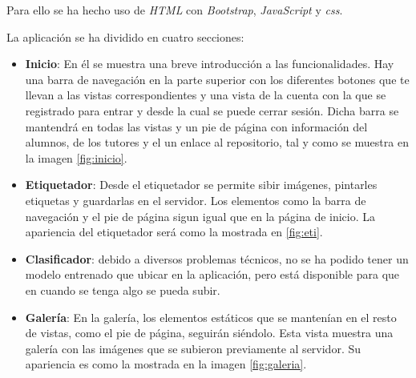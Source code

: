  Para ello se ha hecho uso de \textit{HTML} con \textit{Bootstrap}, \textit{JavaScript} y \textit{css}.
 
 La aplicación se ha dividido en cuatro secciones:
 
 \begin{itemize}
 	\item \textbf{Inicio}: En él se muestra una breve introducción a las funcionalidades. Hay una barra de navegación en la parte superior con los diferentes botones que te llevan a las vistas correspondientes y una vista de la cuenta con la que se registrado para entrar y desde la cual se puede cerrar sesión.
 	 Dicha barra se mantendrá en todas las vistas y un pie de página con información del alumnos, de los tutores y el un enlace al repositorio, tal y como se muestra en la imagen \ref{fig:inicio}.
 	
 	\item \textbf{Etiquetador}: Desde el etiquetador se permite sibir imágenes, pintarles etiquetas y guardarlas en el servidor.
 	Los elementos como la barra de navegación y el pie de página sigun igual que en la página de inicio. La apariencia del etiquetador será como la mostrada en \ref{fig:eti}.
 	\item \textbf{Clasificador}: debido a diversos problemas técnicos, no se ha podido tener un modelo entrenado que ubicar en la aplicación, pero está disponible para que en cuando se tenga algo se pueda subir.
 	
 	\item \textbf{Galería}: En la galería, los elementos estáticos que se mantenían en el resto de vistas, como el pie de página, seguirán siéndolo.
 	Esta vista muestra una galería con las imágenes que se subieron previamente al servidor. Su apariencia es como la mostrada en la imagen \ref{fig:galeria}.
 	
 \end{itemize}
 

